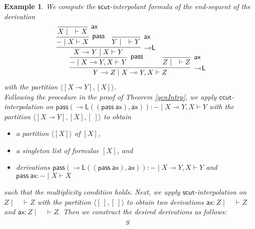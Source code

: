 \documentclass[sn-mathphys-num]{sn-jnl}%
\newcommand{\GG}{\Gamma}
\newcommand{\GD}{\Delta}
\newcommand{\GL}{\Lambda}
\newcommand{\GO}{\Omega}
\newcommand{\vd}{\vdash}
\newcommand{\pass}{\mathsf{pass}}
\newcommand{\ax}{\mathsf{ax}}
\newcommand{\ot}{\otimes}
\newcommand{\lolli}{\multimap}
\newcommand{\lleft}{{\lolli}\mathsf{L}}
\newcommand{\mf}[1]{\mathsf{#1}}
\newcommand{\gs}[1]{\sigma_{X} (#1)}
\theoremstyle{thmstyleone}%
\theoremstyle{thmstyletwo}%
\newtheorem{example}[theorem]{Example}%
\theoremstyle{thmstylethree}%
\begin{document}
\begin{example}
  We compute the $\mf{scut}$-interpolant formula of the end-sequent of the derivation 
  \begin{displaymath}
    \begin{array}{c}
      \infer[\lleft]{Y \lolli Z \mid X \lolli Y , X \vd Z}{
        \infer[\pass]{{-} \mid X \lolli Y ,X \vd Y}{
          \infer[\lleft]{X \lolli Y \mid X \vd Y}{
            \infer[\pass]{{-} \mid X \vd X}{
              \infer[\ax]{X \mid \quad \vd X}{}
            }
            &
            \infer[\ax]{Y \mid \quad \vd Y}{}
          }
        }
        &
        \infer[\ax]{Z \mid \quad \vd Z}{}
      }
    \end{array}
  \end{displaymath}
  with the partition $\langle [X \lolli Y] , [X]\rangle$.
  \\
  Following the procedure in the proof of Theorem \ref{genIntrp}, we apply $\mf{ccut}$-interpolation on $\pass (\lleft ((\pass \ \ax), \ax)) : {-} \mid X \lolli Y , X \vd Y$ with the partition $\langle [X \lolli Y] , [X] , [\ ] \rangle$ to obtain
  \begin{itemize}
    \item[--] a partition $\langle [X] \rangle$ of $[X]$,
    \item[--] a singleton list of formulae $[X]$, and
    \item[--] derivations $\pass (\lleft ((\pass \ \ax), \ax)) : {-} \mid X \lolli Y , X \vd Y$ and $ \pass \ \ax : {-} \mid X \vd X$ 
  \end{itemize}
  such that the multiplicity condition holds.
  Next, we apply $\mf{scut}$-interpolation on $Z \mid \quad \vd Z$ with the partition $\langle [\ ] , [\ ] \rangle$ to obtain two derivations $\ax : Z \mid \quad \vd Z$ and $\ax : Z \mid \quad \vd Z$.
  Then we construct the desired derivations as follows:
  \begin{displaymath}
    \begin{array}{lc}
      \begin{array}{c}
        g
      \end{array}
      \quad

\end{array}
\end{displaymath}
\end{example}
\end{document}
